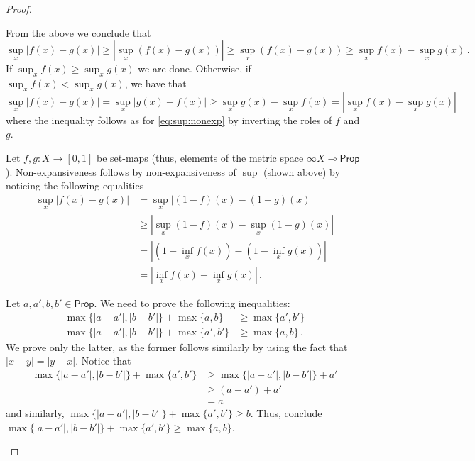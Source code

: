 \documentclass[a4paper,UKenglish,cleveref, autoref, thm-restate]{lipics-v2021}
\newcommand{\lol}{\mathbin{\multimap}}
\newcommand{\mexp}{\lol}
\newcommand{\scaling}{}
\newcommand{\Prop}{\mathsf{Prop}}
\begin{document}
\begin{proof}
\begin{description}[font=\sc,wide]
    From the above we conclude that
    \begin{equation} \label{eq:sup:nonexp}
        \sup_{x} |f(x)-g(x)| 
        \geq 
        |\sup_{x} (f(x)-g(x))|
        \geq
        \sup_{x} (f(x)-g(x))
        \geq 
        \sup_x f(x) - \sup_x g(x) \,.
    \end{equation}
    If $\sup_x f(x) \geq \sup_x g(x)$ we are done. Otherwise, if $\sup_x f(x) < \sup_x g(x)$, we have that 
    \begin{equation*}
        \sup_{x} |f(x)-g(x)| 
        = \sup_{x} |g(x)-f(x)|
        \geq \sup_x g(x) - \sup_x f(x) 
        = |\sup_x f(x) - \sup_x g(x)|
    \end{equation*}
    where the inequality follows as for \eqref{eq:sup:nonexp} by inverting the roles of $f$ and $g$.
    
    \item[Case $\inf$:] 
    Let $f,g \colon X \to [0,1]$ be set-maps (thus, elements of  the metric space $\infty\scaling X \mexp \Prop$). Non-expansiveness follows by non-expansiveness of $\sup$ (shown above) by noticing the following equalities
    \begin{align*}
        \sup_{x} |f(x)-g(x)|
        &= \sup_{x} |(1-f)(x)-(1-g)(x)| \\
        &\geq |\sup_x (1-f)(x) - \sup_x (1-g)(x)| 
        \tag{$\sup$ non-exp} \\
        &= |(1-\inf_x f(x)) - (1 - \inf_x g(x))| \\
        &= |\inf_x f(x) - \inf_x g(x)| \,.
    \end{align*}
    

    \item[Case $\max$:]
    Let $a,a',b,b'\in \Prop$. We need to prove the following inequalities:
    \begin{align*}
        \max\{|a - a'|, |b-b'|\} + \max\{a, b\} &\geq \max\{a', b'\}
        \\%
        \max\{|a - a'|, |b-b'|\} + \max\{a', b'\} &\geq \max\{a, b\} \,.
    \end{align*}
    We prove only the latter, as the former follows similarly by using the fact
    that $|x - y| = |y - x|$.
    Notice that 
    \begin{align*}
        \max\{|a - a'|, |b-b'|\} + \max\{a', b'\}
        &\geq \max\{|a - a'|, |b-b'|\} + a' \\
        &\geq (a-a') + a' \\
        &= a
    \end{align*}
    and similarly, $\max\{|a - a'|, |b-b'|\} + \max\{a', b'\} \geq b$.
    Thus, conclude $\max\{|a - a'|, |b-b'|\} + \max\{a', b'\} \geq \max\{a, b\}$.


\end{description}
\end{proof}
\end{document}
